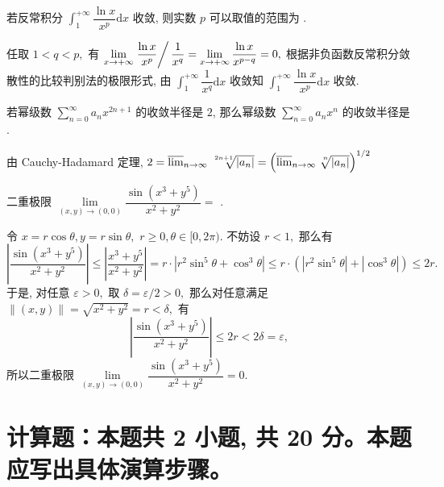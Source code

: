 \begin{question}
  若反常积分 $\int_1^{+\infty} \dfrac{\ln x}{x^p} \mathrm{d} x$ 收敛, 则实数 $p$ 可以取值的范围为 \fillin[$(1, +\infty)$ (或写 $p > 1$)].
\end{question}

\begin{solution}
  任取 $1 < q < p,$ 有 $\lim\limits_{x\to+\infty} \left. \dfrac{\ln x}{x^p} \right/ \dfrac{1}{x^q} = \lim\limits_{x\to+\infty} \dfrac{\ln x}{x^{p-q}} = 0,$ 根据非负函数反常积分敛散性的比较判别法的极限形式, 由 $\int_1^{+\infty} \dfrac{1}{x^q} \mathrm{d} x$ 收敛知 $\int_1^{+\infty} \dfrac{\ln x}{x^p} \mathrm{d} x$ 收敛.
\end{solution}

\begin{question}
  若幂级数 $\sum\limits_{n=0}^\infty a_n x^{2n+1}$ 的收敛半径是 $2$, 那么幂级数 $\sum\limits_{n=0}^\infty a_n x^n$ 的收敛半径是 \fillin[$4$].
\end{question}

\begin{solution}
  由 Cauchy-Hadamard 定理, $2 = \varlimsup_{n\to\infty}\nroot[2n+1]{\lvert a_n
  \rvert} = \left( \varlimsup_{n\to\infty}\nroot[n]{\lvert a_n \rvert} \right)^{1/2}$
\end{solution}

\begin{question}
  二重极限 $\lim\limits_{(x,y) \to (0,0)} \dfrac{\sin(x^3 + y^5)}{x^2 + y^2} =$
   \fillin[$0$].
\end{question}

\begin{solution}
  令 $x = r\cos\theta, y = r\sin\theta,$ $r \geqslant 0, \theta \in [0, 2\pi).$ 不妨设 $r < 1,$ 那么有
  $$\left\lvert \dfrac{\sin(x^3 + y^5)}{x^2 + y^2} \right\rvert \leqslant \left\lvert \dfrac{x^3 + y^5}{x^2 + y^2} \right\rvert = r \cdot \left\lvert r^2\sin^5\theta + \cos^3\theta \right\rvert \leqslant r \cdot \left( \left\lvert r^2\sin^5\theta \right\rvert + \left\lvert \cos^3\theta \right\rvert \right) \leqslant 2 r.$$
  于是, 对任意 $\varepsilon > 0,$ 取 $\delta = \varepsilon / 2 > 0,$ 那么对任意满足 $\lVert (x, y) \rVert = \sqrt{x^2 + y^2} = r < \delta,$ 有
  $$\left\lvert \dfrac{\sin(x^3 + y^5)}{x^2 + y^2} \right\rvert \leqslant 2r < 2\delta = \varepsilon,$$
  所以二重极限 $\lim\limits_{(x,y) \to (0,0)} \dfrac{\sin(x^3 + y^5)}{x^2 + y^2} = 0.$
\end{solution}


\section{计算题：本题共 2 小题, 共 20 分。本题应写出具体演算步骤。}

